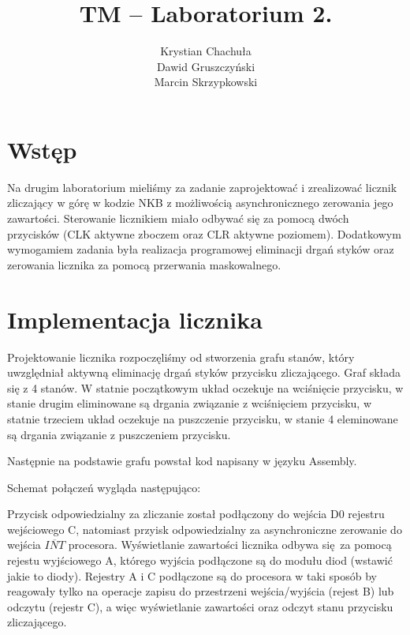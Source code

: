 \documentclass[fleqn]{article}
\title{TM -- Laboratorium 2.}
\author{Krystian Chachuła \\ Dawid Gruszczyński \\ Marcin Skrzypkowski}
\begin{document}
\maketitle

\setcounter{page}{0}
\thispagestyle{empty}

\pagebreak

\setcounter{page}{1}

\section{Wstęp}

Na drugim laboratorium mieliśmy za zadanie zaprojektować i zrealizować licznik zliczający w górę w kodzie NKB z możliwością asynchronicznego zerowania jego zawartości.
Sterowanie licznikiem miało odbywać się za pomocą dwóch przycisków (CLK aktywne zboczem oraz CLR aktywne poziomem).
Dodatkowym wymogamiem zadania była realizacja programowej eliminacji drgań styków oraz zerowania licznika za pomocą przerwania maskowalnego.

\section{Implementacja licznika}

Projektowanie licznika rozpoczęliśmy od stworzenia grafu stanów, który uwzględniał aktywną eliminację drgań styków przycisku zliczającego.
Graf składa się z 4 stanów. W statnie początkowym układ oczekuje na wciśnięcie przycisku, w stanie drugim eliminowane są drgania związanie z wciśnięciem przycisku, w statnie trzeciem układ oczekuje na puszczenie przycisku, w stanie 4 eleminowane są drgania związanie z puszczeniem przycisku.


Następnie na podstawie grafu powstał kod napisany w języku Assembly.


Schemat połączeń wygląda następująco:


Przycisk odpowiedzialny za zliczanie został podłączony do wejścia D0 rejestru wejściowego C, natomiast przyisk odpowiedzialny za asynchroniczne zerowanie do wejścia $\overline{INT}$ procesora.
Wyświetlanie zawartości licznika odbywa się za pomocą rejestu wyjściowego A, którego wyjścia podłączone są do modułu diod (wstawić jakie to diody). Rejestry A i C podłączone są do procesora w taki sposób by reagowały tylko na operacje zapisu do przestrzeni wejścia/wyjścia (rejest B) lub odczytu (rejestr C), a więc wyświetlanie zawartości oraz odczyt stanu przycisku zliczającego.
\end{document}
